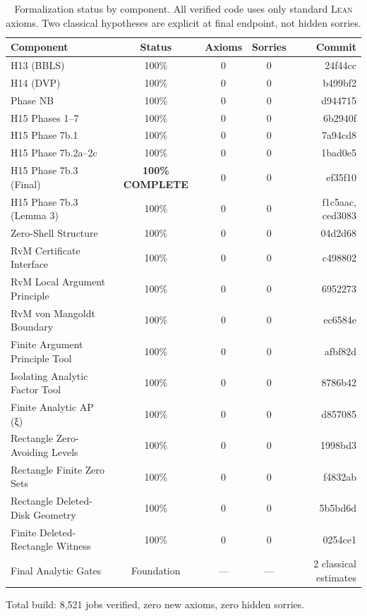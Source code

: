 \documentclass[11pt,a4paper]{article}
\newcommand{\Lean}{\textsc{Lean}\xspace}
\begin{document}
\begin{table}[h]
\centering
\begin{tabular}{lcccr}
\toprule
\textbf{Component} & \textbf{Status} & \textbf{Axioms} & \textbf{Sorries} & \textbf{Commit} \\
\midrule
H13 (BBLS) & 100\% & 0 & 0 & 24f44cc \\
H14 (DVP) & 100\% & 0 & 0 & b499bf2 \\
Phase NB & 100\% & 0 & 0 & d944715 \\
H15 Phases 1--7 & 100\% & 0 & 0 & 6b2940f \\
H15 Phase 7b.1 & 100\% & 0 & 0 & 7a94cd8 \\
H15 Phase 7b.2a--2c & 100\% & 0 & 0 & 1bad0e5 \\
H15 Phase 7b.3 (Final) & \textbf{100\% COMPLETE} & 0 & 0 & ef35f10 \\
H15 Phase 7b.3 (Lemma 3) & 100\% & 0 & 0 & f1c5aac, ced3083 \\
Zero-Shell Structure & 100\% & 0 & 0 & 04d2d68 \\
RvM Certificate Interface & 100\% & 0 & 0 & c498802 \\
RvM Local Argument Principle & 100\% & 0 & 0 & 6952273 \\
RvM von Mangoldt Boundary & 100\% & 0 & 0 & ec6584e \\
Finite Argument Principle Tool & 100\% & 0 & 0 & afbf82d \\
Isolating Analytic Factor Tool & 100\% & 0 & 0 & 8786b42 \\
Finite Analytic AP (ξ) & 100\% & 0 & 0 & d857085 \\
Rectangle Zero-Avoiding Levels & 100\% & 0 & 0 & 1998bd3 \\
Rectangle Finite Zero Sets & 100\% & 0 & 0 & f4832ab \\
Rectangle Deleted-Disk Geometry & 100\% & 0 & 0 & 5b5bd6d \\
Finite Deleted-Rectangle Witness & 100\% & 0 & 0 & 0254ce1 \\
\midrule
Final Analytic Gates & Foundation & — & — & 2 classical estimates \\
\bottomrule
\end{tabular}
\caption{Formalization status by component. All verified code uses only standard \Lean axioms. Two classical hypotheses are explicit at final endpoint, not hidden sorries.}
\label{tab:status}
\end{table}

Total build: 8,521 jobs verified, zero new axioms, zero hidden sorries.
\end{document}
